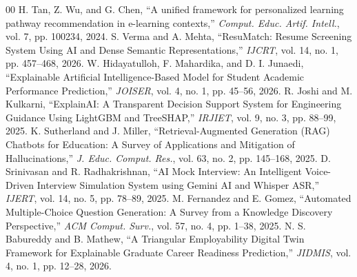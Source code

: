 \documentclass[conference]{IEEEtran}
\begin{document}
\begin{thebibliography}{00}
 H. Tan, Z. Wu, and G. Chen, ``A unified framework for personalized learning pathway recommendation in e-learning contexts,'' \textit{Comput. Educ. Artif. Intell.}, vol. 7, pp. 100234, 2024.
 S. Verma and A. Mehta, ``ResuMatch: Resume Screening System Using AI and Dense Semantic Representations,'' \textit{IJCRT}, vol. 14, no. 1, pp. 457--468, 2026.
 W. Hidayatulloh, F. Mahardika, and D. I. Junaedi, ``Explainable Artificial Intelligence-Based Model for Student Academic Performance Prediction,'' \textit{JOISER}, vol. 4, no. 1, pp. 45--56, 2026.
 R. Joshi and M. Kulkarni, ``ExplainAI: A Transparent Decision Support System for Engineering Guidance Using LightGBM and TreeSHAP,'' \textit{IRJIET}, vol. 9, no. 3, pp. 88--99, 2025.
 K. Sutherland and J. Miller, ``Retrieval-Augmented Generation (RAG) Chatbots for Education: A Survey of Applications and Mitigation of Hallucinations,'' \textit{J. Educ. Comput. Res.}, vol. 63, no. 2, pp. 145--168, 2025.
 D. Srinivasan and R. Radhakrishnan, ``AI Mock Interview: An Intelligent Voice-Driven Interview Simulation System using Gemini AI and Whisper ASR,'' \textit{IJERT}, vol. 14, no. 5, pp. 78--89, 2025.
 M. Fernandez and E. Gomez, ``Automated Multiple-Choice Question Generation: A Survey from a Knowledge Discovery Perspective,'' \textit{ACM Comput. Surv.}, vol. 57, no. 4, pp. 1--38, 2025.
 N. S. Babureddy and B. Mathew, ``A Triangular Employability Digital Twin Framework for Explainable Graduate Career Readiness Prediction,'' \textit{JIDMIS}, vol. 4, no. 1, pp. 12--28, 2026.
\end{thebibliography}
\end{document}
